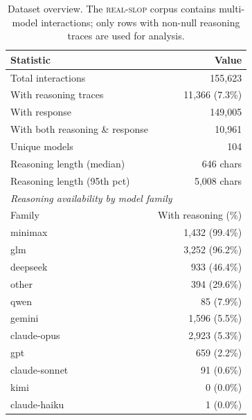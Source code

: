 \begin{table}[t]
\centering
\caption{Dataset overview. The \textsc{real-slop} corpus contains multi-model interactions; only rows with non-null reasoning traces are used for analysis.}
\label{tab:dataset}
\small
\begin{tabular}{lr}
\toprule
Statistic & Value \\
\midrule
Total interactions & 155{,}623 \\
With reasoning traces & 11{,}366 (7.3\%) \\
With response & 149{,}005 \\
With both reasoning \& response & 10{,}961 \\
Unique models & 104 \\
Reasoning length (median) & 646 chars \\
Reasoning length (95th pct) & 5{,}008 chars \\
\midrule
\multicolumn{2}{l}{\textit{Reasoning availability by model family}} \\
\midrule
Family & With reasoning (\%) \\
\midrule
minimax & 1{,}432 (99.4\%) \\
glm & 3{,}252 (96.2\%) \\
deepseek & 933 (46.4\%) \\
other & 394 (29.6\%) \\
qwen & 85 (7.9\%) \\
gemini & 1{,}596 (5.5\%) \\
claude-opus & 2{,}923 (5.3\%) \\
gpt & 659 (2.2\%) \\
claude-sonnet & 91 (0.6\%) \\
kimi & 0 (0.0\%) \\
claude-haiku & 1 (0.0\%) \\
\bottomrule
\end{tabular}
\end{table}